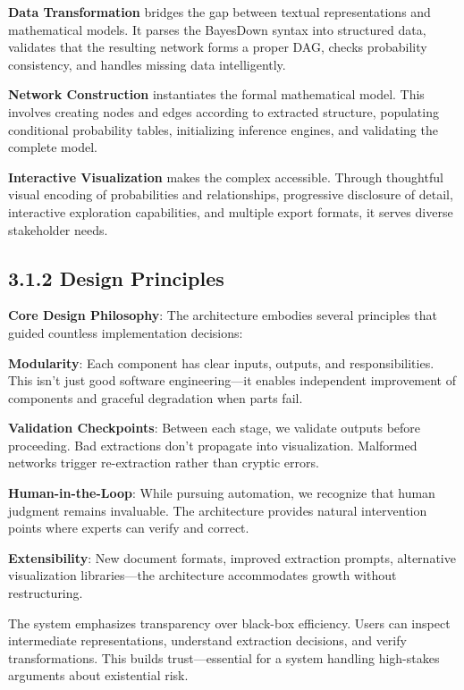 \documentclass[
  11pt,
  letterpaper,
]{book}
\begin{document}
\textbf{Data Transformation} bridges the gap between textual
representations and mathematical models. It parses the BayesDown syntax
into structured data, validates that the resulting network forms a
proper DAG, checks probability consistency, and handles missing data
intelligently.

\textbf{Network Construction} instantiates the formal mathematical
model. This involves creating nodes and edges according to extracted
structure, populating conditional probability tables, initializing
inference engines, and validating the complete model.

\textbf{Interactive Visualization} makes the complex accessible. Through
thoughtful visual encoding of probabilities and relationships,
progressive disclosure of detail, interactive exploration capabilities,
and multiple export formats, it serves diverse stakeholder needs.

\subsection{3.1.2 Design Principles}\label{sec-design-principles}

\textbf{Core Design Philosophy}: The architecture embodies several
principles that guided countless implementation decisions:

\textbf{Modularity}: Each component has clear inputs, outputs, and
responsibilities. This isn't just good software engineering---it enables
independent improvement of components and graceful degradation when
parts fail.

\textbf{Validation Checkpoints}: Between each stage, we validate outputs
before proceeding. Bad extractions don't propagate into visualization.
Malformed networks trigger re-extraction rather than cryptic errors.

\textbf{Human-in-the-Loop}: While pursuing automation, we recognize that
human judgment remains invaluable. The architecture provides natural
intervention points where experts can verify and correct.

\textbf{Extensibility}: New document formats, improved extraction
prompts, alternative visualization libraries---the architecture
accommodates growth without restructuring.

The system emphasizes transparency over black-box efficiency. Users can
inspect intermediate representations, understand extraction decisions,
and verify transformations. This builds trust---essential for a system
handling high-stakes arguments about existential risk.
\end{document}
